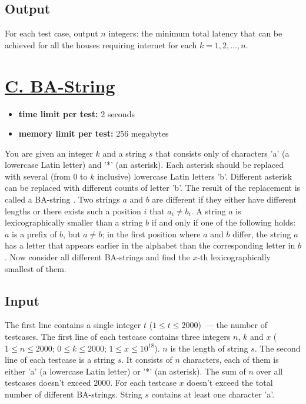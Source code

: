 \documentclass{article}
\begin{document}
\subsection*{Output}
 For each test case, output $n$ integers: the minimum total latency that can be achieved for all the houses requiring internet for each $k = 1,2,\ldots,n$.

\section{\href{https://codeforces.com/problemset/problem/1620/C}{C. BA-String}}

\begin{itemize}
\item \textbf{time limit per test:}  2 seconds
\item \textbf{memory limit per test:}  256 megabytes
\end{itemize}
You are given an integer $k$ and a string $s$ that consists only of characters 'a' (a lowercase Latin letter) and '*' (an asterisk). Each asterisk should be replaced with several (from $0$ to $k$ inclusive) lowercase Latin letters 'b'. Different asterisk can be replaced with different counts of letter 'b'. The result of the replacement is called a BA-string . Two strings $a$ and $b$ are different if they either have different lengths or there exists such a position $i$ that $a_i \neq b_i$. A string $a$ is lexicographically smaller than a string $b$ if and only if one of the following holds: $a$ is a prefix of $b$, but $a \ne b$; in the first position where $a$ and $b$ differ, the string $a$ has a letter that appears earlier in the alphabet than the corresponding letter in $b$. Now consider all different BA-strings and find the $x$-th lexicographically smallest of them.

\subsection*{Input}
 The first line contains a single integer $t$ ($1 \le t \le 2000$) — the number of testcases. The first line of each testcase contains three integers $n$, $k$ and $x$ ($1 \le n \le 2000$; $0 \le k \le 2000$; $1 \le x \le 10^{18}$). $n$ is the length of string $s$. The second line of each testcase is a string $s$. It consists of $n$ characters, each of them is either 'a' (a lowercase Latin letter) or '*' (an asterisk). The sum of $n$ over all testcases doesn't exceed $2000$. For each testcase $x$ doesn't exceed the total number of different BA-strings. String $s$ contains at least one character 'a'.
\end{document}
